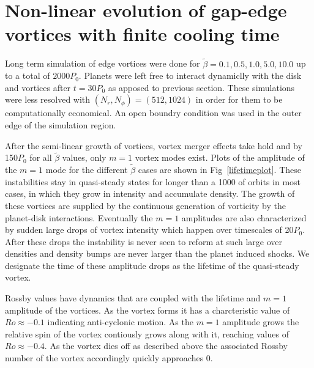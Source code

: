 \section{Non-linear evolution of
  gap-edge vortices with finite cooling time} 

Long term simulation of edge vortices were done for $\tilde{\beta}=0.1,0.5,1.0,5.0,10.0$ up to a total of $2000P_0$. Planets were left free to interact dynamiclly with the disk and vortices after $t=30P_0$ as apposed to previous section. These simulations were less resolved with $(N_r,N_{\phi})=(512,1024)$ in order for them to be computationally economical. An open boundry condition was used in the outer edge of the simulation region.

After the semi-linear growth of vortices, vortex merger effects take hold and by 150$P_0$ for all $\tilde\beta$ values, only $m=1$ vortex modes exist. Plots of the amplitude of the $m=1$ mode for the different $\tilde\beta$ cases are shown in Fig~\ref{lifetimeplot}. These instabilities stay in quasi-steady states for longer than a 1000 of orbits in most cases, in which they grow in intensity and accumulate density. The growth of these vortices are supplied by the continuous generation of vorticity by the planet-disk interactions. Eventually the $m=1$ amplitudes are also characterized by sudden large drops of vortex intensity which happen over timescales of 20$P_0$. After these drops the instability is never seen to reform at such large over densities and density bumps are never larger than the planet induced shocks. We designate the time of these amplitude drops as the lifetime of the quasi-steady vortex. 

Rossby values have dynamics that are coupled with the lifetime and $m=1$ amplitude of the vortices. As the vortex forms it has a charcteristic value of $Ro\approx-0.1$ indicating anti-cyclonic motion. As the $m=1$ amplitude grows the relative spin of the vortex contiously grows along with it, reaching values of $Ro\approx-0.4$. As the vortex dies off as described above the associated Rossby number of the vortex accordingly quickly approaches 0.

